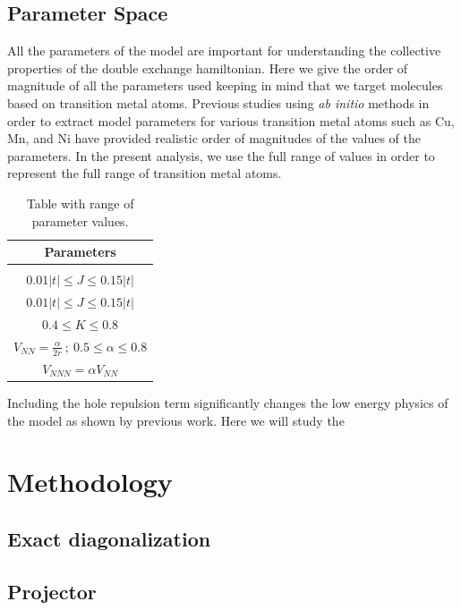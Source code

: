 \documentclass[ openright,titlepage,numbers=noenddot,headinclude,twoside,%
                footinclude=true,cleardoublepage=empty,abstractoff,%
                BCOR=5mm,paper=a4,fontsize=11pt,%
                ngerman,american,%
]{scrreprt}
\begin{document}
\section{Parameter Space}

All the parameters of the model are important for understanding the collective
properties of the double exchange hamiltonian. Here we give the order of magnitude
of all the parameters used keeping in mind that we target molecules based on
transition metal atoms.
Previous studies using \textit{ab initio} methods in order to extract model
parameters for various transition metal atoms such as Cu, Mn, and Ni have
provided realistic order of magnitudes of the values of the parameters.
In the present analysis, we use the full range of values in order to represent
the full range of transition metal atoms.

\begin{table}[h!]
\centering
\begin{tabular}{||c||}
 \hline
 Parameters  \\ [0.5ex]
 \hline\hline
 \\
    $ 0.01\lvert t \rvert \le J \le 0.15\lvert t \rvert $    \\ [1ex]
    $ 0.01\lvert t \rvert \le J \le 0.15\lvert t \rvert $    \\ [1ex]
    $ 0.4 \le K \le 0.8 $                                    \\ [1ex]
    $ V_{NN} = \frac{\alpha}{2r}\ ;\ 0.5 \le \alpha \le 0.8 $ \\ [1ex]
    $ V_{NNN} = \alpha V_{NN} $                                \\ [1ex]
 \hline
\end{tabular}
\label{tab:params}
\caption{Table with range of parameter values.}
\end{table}

Including the hole repulsion term
significantly changes the low energy physics of the model as shown by previous
work\cite{calzado_proposal_2001}. Here we will study the


\chapter{Methodology}

\section{Exact diagonalization}

\section{Projector}
\end{document}
